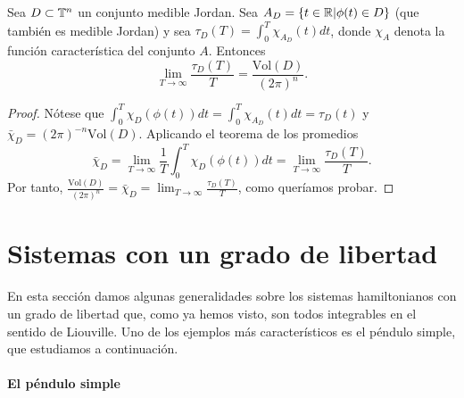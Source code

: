 \begin{corol}
  Sea $D\subset \mathbb{T}^n$ un conjunto medible Jordan. Sea $A_D=\{t\in \mathbb{R} | \phi(t) \in D\}$ (que también es medible Jordan) y sea $\tau_D(T)=\int_0^T\chi_{A_D}(t)dt$, donde $\chi_A$ denota la función característica del conjunto $A$. Entonces
  \begin{equation*}
    \lim_{T\rightarrow \infty}\frac{\tau_D(T)}{T}= \frac{\mathrm{Vol}(D)}{(2\pi)^n}.
  \end{equation*}
\end{corol}
\begin{proof}
  Nótese que $\int_0^T \chi_D(\phi(t))dt=\int_0^T \chi_{A_D}(t)dt=\tau_D(t)$ y $\bar{\chi}_D=(2\pi)^{-n}\mathrm{Vol}(D)$. Aplicando el teorema de los promedios
  \begin{equation*}
    \bar{\chi}_D=\lim_{T\rightarrow \infty}\frac{1}{T}\int_0^T \chi_D(\phi(t))dt=\lim_{T\rightarrow \infty}\frac{\tau_D(T)}{T}.
  \end{equation*}
  Por tanto, $\frac{\mathrm{Vol}(D)}{(2\pi)^n}=\bar{\chi}_D=\lim_{T\rightarrow \infty}\frac{\tau_D(T)}{T}$, como queríamos probar.
\end{proof}
\section{Sistemas con un grado de libertad}
En esta sección damos algunas generalidades sobre los sistemas hamiltonianos con un grado de libertad que, como ya hemos visto, son todos integrables en el sentido de Liouville. Uno de los ejemplos más característicos es el péndulo simple, que estudiamos a continuación.
  
\paragraph{\bf El péndulo simple}\mbox{}
  
